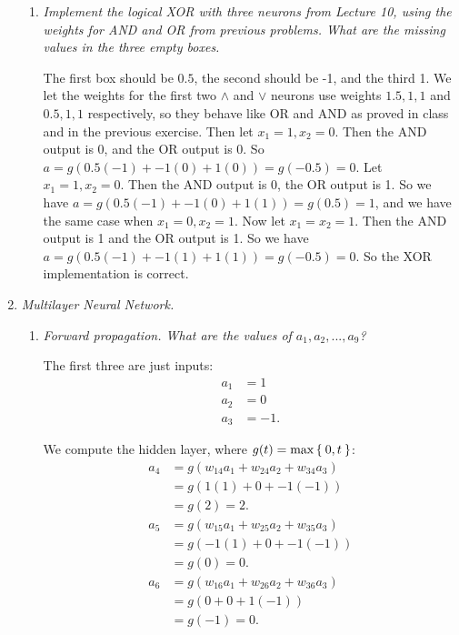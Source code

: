 \documentclass[12pt,oneside,reqno]{amsart}
\theoremstyle{plain}
\theoremstyle{definition}
\theoremstyle{remark}
\newcommand{\bee}{\begin{equation}\begin{aligned}}
\newcommand{\eee}{\end{aligned}\end{equation}}
\newcommand{\lpar}{\left(}
\newcommand{\rpar}{\right)}
\begin{document}
\begin{enumerate}[label=\arabic*.]
\begin{enumerate}
\item \textit{Implement the logical XOR with three neurons from Lecture 10, using the weights for AND and OR from previous problems. What are the missing values in the three empty boxes. }

The first box should be $0.5$, the second should be -1, and the third 1. We let the weights for the first two $\wedge$ and $\vee$ neurons use weights $1.5,1,1$ and $0.5,1,1$ respectively, so they behave like OR and AND as proved in class and in the previous exercise. Then let $x_1 = 1,x_2 = 0$. Then the AND output is $0$, and the OR output is 0. So $a = g(0.5(-1) + -1(0) + 1(0)) = g(-0.5) = 0$. Let $x_1 = 1,x_2 = 0$. Then the AND output is 0, the OR output is 1. So we have $a = g(0.5(-1) + -1(0) + 1(1)) = g(0.5) = 1$, and we have the same case when $x_1 = 0,x_2 = 1$. Now let $x_1 = x_2 = 1$. Then the AND output is 1 and the OR output is 1. So we have $a = g(0.5(-1) + -1(1) + 1(1)) = g(-0.5) = 0$. So the XOR implementation is correct. 


\end{enumerate}

\item \textit{Multilayer Neural Network. }

\begin{enumerate}
\item \textit{Forward propagation. What are the values of $a_1,a_2,...,a_9$?}


The first three are just inputs:
\bee
a_1 &= 1\\
a_2 &= 0\\
a_3 &= -1.
\eee

We compute the hidden layer, where $g(t) = \max\Set{0,t}$:
\bee
a_4 &= g\lpar w_{14}a_1 + w_{24}a_2 + w_{34}a_3 \rpar \\
&= g\lpar 1(1) + 0 + -1(-1) \rpar \\
&= g(2) = 2.\\
a_5 &= g\lpar w_{15}a_1 + w_{25}a_2 + w_{35}a_3 \rpar \\
&= g\lpar -1(1) + 0 + -1(-1) \rpar \\
&= g(0) = 0.\\
a_6 &= g\lpar w_{16}a_1 + w_{26}a_2 + w_{36}a_3 \rpar \\
&= g\lpar 0 + 0 + 1(-1) \rpar \\
&= g(-1) = 0.\\
\eee


\end{enumerate}
\end{enumerate}
\end{document}
